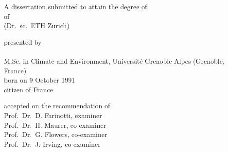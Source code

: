 \begin{titlepage}
    \begin{center}
        \large
        \begingroup
        \endgroup

        \hfill

        \vfill

        \begingroup
            \spacedallcaps{\myTitle}
        \endgroup

        \vfill

        \begingroup
            A dissertation submitted to attain the degree of\\
            \vspace{0.5em}
            of
             \\
            (Dr.\ sc.\ ETH Zurich)
        \endgroup

        \vfill

        \begingroup
            presented by\\
            \vspace{0.5em}
            \spacedlowsmallcaps{\myName}\\
            M.Sc. in Climate and Environment, Université Grenoble Alpes (Grenoble, France) \\
            \vspace{0.5em}
            born on 9 October 1991\\
            citizen of France
        \endgroup

        \vfill

        \begingroup
            accepted on the recommendation of\\
            \vspace{0.5em}
            Prof.\ Dr.\ D. Farinotti, examiner\\
            Prof.\ Dr.\ H. Maurer, co-examiner\\
            Prof.\ Dr.\ G. Flowers, co-examiner\\
            Prof.\ Dr.\ J. Irving, co-examiner\\
        \endgroup

        \vfill

        \myTime%

        \vfill
    \end{center}
\end{titlepage}
